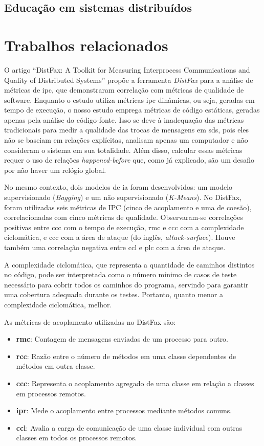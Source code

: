 {\subsection{Educação em sistemas distribuídos}

\section{Trabalhos relacionados}
\label{section:related-work}

O artigo ``DistFax: A Toolkit for Measuring Interprocess Communications and Quality of Distributed Systems'' \cite{DistFax} propõe a ferramenta \textit{DistFax} para a análise de métricas de \gls{ipc}, que demonstraram correlação com métricas de qualidade de software. Enquanto o estudo utiliza métricas \gls{ipc} dinâmicas, ou seja, geradas em tempo de execução, o nosso estudo emprega métricas de código estáticas, geradas apenas pela análise do código-fonte. Isso se deve à inadequação das métricas tradicionais para medir a qualidade das trocas de mensagens em \gls{sds}, pois eles não se baseiam em relações explícitas, analisam apenas um computador e não consideram o sistema em sua totalidade. Além disso, calcular essas métricas requer o uso de relações \textit{happened-before} que, como já explicado, são um desafio por não haver um relógio global.

No mesmo contexto, dois modelos de \gls{ia} foram desenvolvidos: um modelo supervisionado (\textit{Bagging}) e um não supervisionado (\textit{K-Means}). No DistFax, foram utilizadas seis métricas de IPC (cinco de acoplamento e uma de coesão), correlacionadas com cinco métricas de qualidade. Observaram-se correlações positivas entre \gls{ccc} com o tempo de execução, \gls{rmc} e \gls{ccc} com a complexidade ciclomática, e \gls{ccc} com a área de ataque (do inglês, \textit{attack-surface}). Houve também uma correlação negativa entre \gls{ccl} e \gls{plc} com a área de ataque.

A complexidade ciclomática, que representa a quantidade de caminhos distintos no código, pode ser interpretada como o número mínimo de casos de teste necessário para cobrir todos os caminhos do programa, servindo para garantir uma cobertura adequada durante os testes. Portanto, quanto menor a complexidade ciclomática, melhor.

As métricas de acoplamento utilizadas no DistFax são:
\begin{itemize}
    \item \textbf{\gls{rmc}}: Contagem de mensagens enviadas de um processo para outro.
    \item \textbf{\gls{rcc}}: Razão entre o número de métodos em uma classe dependentes de métodos em outra classe.
    \item \textbf{\gls{ccc}}: Representa o acoplamento agregado de uma classe em relação a classes em processos remotos.
    \item \textbf{\gls{ipr}}: Mede o acoplamento entre processos mediante métodos comuns.
    \item \textbf{\gls{ccl}}: Avalia a carga de comunicação de uma classe individual com outras classes em todos os processos remotos.
\end{itemize}

}
